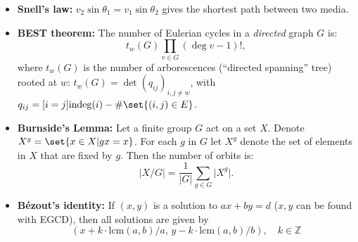 \documentclass[9pt,a4paper,landscape,oneside]{amsart}
\newenvironment{myitemize}
{\begin{itemize}[leftmargin=.3cm]
	\setlength{\itemsep}{0pt}
	\setlength{\parskip}{0pt}
	\setlength{\parsep}{0pt}     }
{ \end{itemize}                  }
\begin{document}
\begin{multicols*}{3}
\begin{myitemize}
		expressed as a linear combination of numbers $a_1,\ldots,a_n$
		with non-negative coefficients. $g(a_1,a_2) = a_1a_2-a_1-a_2$,
		$N(a_1,a_2)=(a_1-1)(a_2-1)/2$. $g(d\cdot a_1,d\cdot a_2,a_3) =
		d\cdot g(a_1,a_2,a_3) + a_3(d-1)$. An integer $x>\left(\max_i
		a_i\right)^2$ can be expressed in such a way iff.\ $x\ |\
		\mathrm{gcd}(a_1,\ldots,a_n)$.
	\item \textbf{Snell's law:} $v_2 \sin\theta_1 = v_1 \sin\theta_2$ gives the shortest path between two media.
	\item \textbf{BEST theorem:}
		The number of Eulerian cycles in a \emph{directed} graph $G$ is:
		\begin{equation*}
			t_w(G) \prod_{v \in G} (\deg v - 1)!,
		\end{equation*}
		where $t_w(G)$ is the number of arborescences (``directed spanning'' tree) rooted at $w$: $t_w(G) = \det\left( q_{ij} \right)_{i,j \neq w}$, with $q_{ij} = [i=j] \mathrm{indeg}(i) - \# \set{(i,j) \in E}$.

	\item \textbf{Burnside's Lemma:}
		Let a finite group $G$ act on a set $X$.
		Denote $X^g = \set{ x \in X | gx = x}$.
		For each $g$ in $G$ let $X^g$ denote the set of elements in $X$ that are fixed by $g$.
		Then the number of orbits is:
		\begin{equation*}
			\lvert X/G \rvert = \frac{1}{\lvert G \rvert} \sum_{g\in G} \lvert X^g \rvert.
		\end{equation*}

\item \textbf{Bézout's identity:}
If $(x,y)$ is a solution to $ax+by=d$ ($x, y$ can be found with EGCD),
then all solutions are given by
\[
	\left( x + k \cdot \mathrm{lcm}(a,b) / a, \, y - k \cdot \mathrm{lcm}(a,b) / b \right), \quad k \in \mathbb{Z}
\]
\end{myitemize}


\end{multicols*}
\end{document}

